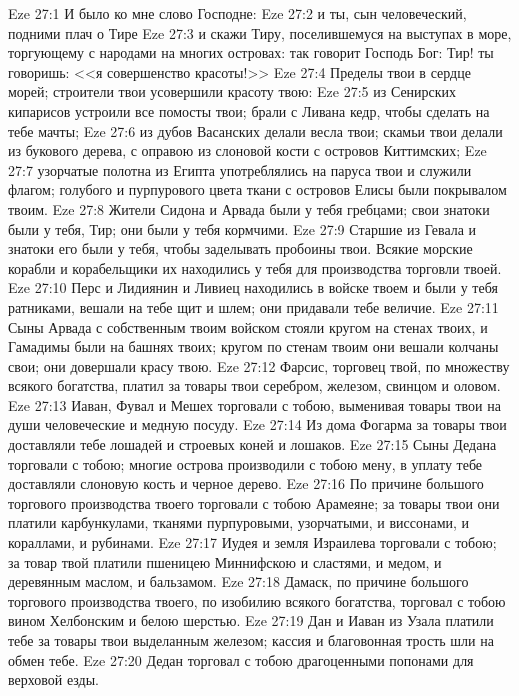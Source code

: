 \vs Eze 27:1 И было ко мне слово Господне:
\vs Eze 27:2 и ты, сын человеческий, подними плач о Тире
\vs Eze 27:3 и скажи Тиру, поселившемуся на выступах в море, торгующему с народами на многих островах: так говорит Господь Бог: Тир! ты говоришь: <<я совершенство красоты!>>
\vs Eze 27:4 Пределы твои в сердце морей; строители твои усовершили красоту твою:
\vs Eze 27:5 из Сенирских кипарисов устроили все помосты твои; брали с Ливана кедр, чтобы сделать на тебе мачты;
\vs Eze 27:6 из дубов Васанских делали весла твои; скамьи твои делали из букового дерева, с оправою из слоновой кости с островов Киттимских;
\vs Eze 27:7 узорчатые полотна из Египта употреблялись на паруса твои и служили флагом; голубого и пурпурового цвета ткани с островов Елисы были покрывалом твоим.
\vs Eze 27:8 Жители Сидона и Арвада были у тебя гребцами; свои знатоки были у тебя, Тир; они были у тебя кормчими.
\vs Eze 27:9 Старшие из Гевала и знатоки его были у тебя, чтобы заделывать пробоины твои. Всякие морские корабли и корабельщики их находились у тебя для производства торговли твоей.
\vs Eze 27:10 Перс и Лидиянин и Ливиец находились в войске твоем и были у тебя ратниками, вешали на тебе щит и шлем; они придавали тебе величие.
\vs Eze 27:11 Сыны Арвада с собственным твоим войском стояли кругом на стенах твоих, и Гамадимы были на башнях твоих; кругом по стенам твоим они вешали колчаны свои; они довершали красу твою.
\vs Eze 27:12 Фарсис, торговец твой, по множеству всякого богатства, платил за товары твои серебром, железом, свинцом и оловом.
\vs Eze 27:13 Иаван, Фувал и Мешех торговали с тобою, выменивая товары твои на души человеческие и медную посуду.
\vs Eze 27:14 Из дома Фогарма за товары твои доставляли тебе лошадей и строевых коней и лошаков.
\vs Eze 27:15 Сыны Дедана торговали с тобою; многие острова производили с тобою мену, в уплату тебе доставляли слоновую кость и черное дерево.
\vs Eze 27:16 По причине большого торгового производства твоего торговали с тобою Арамеяне; за товары твои они платили карбункулами, тканями пурпуровыми, узорчатыми, и виссонами, и кораллами, и рубинами.
\vs Eze 27:17 Иудея и земля Израилева торговали с тобою; за товар твой платили пшеницею Миннифскою и сластями, и медом, и деревянным маслом, и бальзамом.
\vs Eze 27:18 Дамаск, по причине большого торгового производства твоего, по изобилию всякого богатства, торговал с тобою вином Хелбонским и белою шерстью.
\vs Eze 27:19 Дан и Иаван из Узала платили тебе за товары твои выделанным железом; кассия и благовонная трость шли на обмен тебе.
\vs Eze 27:20 Дедан торговал с тобою драгоценными попонами для верховой езды.
